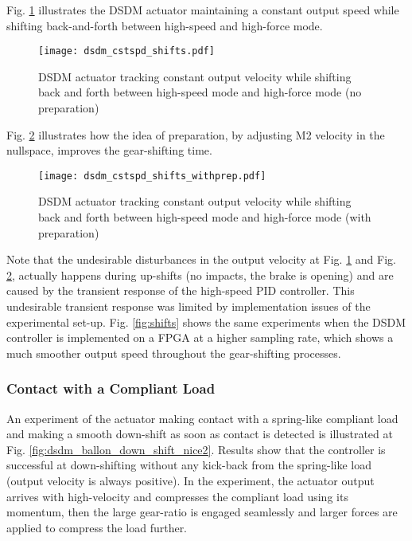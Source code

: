 Fig. \ref{fig:dsdm_cstspd_shifts} illustrates the DSDM actuator maintaining a constant output speed while shifting back-and-forth between high-speed and high-force mode.
%
\begin{figure}[p]
	\centering
		\texttt{[image: dsdm\_cstspd\_shifts.pdf]}
	\caption[DSDM actuator tracking constant output velocity: shifts]{DSDM actuator tracking constant output velocity while shifting back and forth between high-speed mode and high-force mode (no preparation) }
	\label{fig:dsdm_cstspd_shifts}
\end{figure}
%
Fig. \ref{fig:dsdm_cstspd_shifts_withprep} illustrates how the idea of preparation, by adjusting M2 velocity in the nullspace, improves the gear-shifting time. 
%
\begin{figure}[p]
	\centering
		\texttt{[image: dsdm\_cstspd\_shifts\_withprep.pdf]}
	\caption[DSDM actuator tracking constant output velocity: preparation]{DSDM actuator tracking constant output velocity while shifting back and forth between high-speed mode and high-force mode (with preparation) }
	\label{fig:dsdm_cstspd_shifts_withprep}
\end{figure}
%
Note that the undesirable disturbances in the output velocity at Fig. \ref{fig:dsdm_cstspd_shifts} and Fig. \ref{fig:dsdm_cstspd_shifts_withprep}, actually happens during up-shifts (no impacts, the brake is opening) and are caused by the transient response of the high-speed PID controller. This undesirable transient response was limited by implementation issues of the experimental set-up. Fig. \ref{fig:shifts} shows the same experiments when the DSDM controller is implemented on a FPGA at a higher sampling rate, which shows a much smoother output speed throughout the gear-shifting processes. 
%
%

\newpage

\subsubsection{Contact with a Compliant Load}

An experiment of the actuator making contact with a spring-like compliant load and making a smooth down-shift as soon as contact is detected is illustrated at Fig. \ref{fig:dsdm_ballon_down_shift_nice2}. Results show that the controller is successful at down-shifting without any kick-back from the spring-like load (output velocity is always positive). In the experiment, the actuator output arrives with high-velocity and compresses the compliant load using its momentum, then the large gear-ratio is engaged seamlessly and larger forces are applied to compress the load further. 

